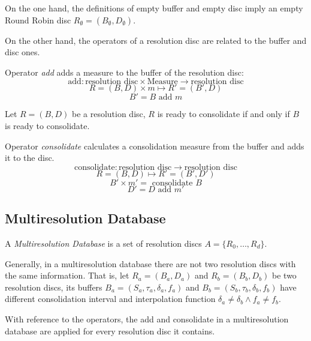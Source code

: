 On the one hand, the definitions of empty buffer and empty disc imply
an empty Round Robin disc $R_{\emptyset} = (B_{\emptyset},D_{\emptyset})$.

On the other hand, the operators of a resolution disc are related to
the buffer and disc ones.

\begin{definition}
  Operator \emph{add} adds a measure  to the buffer of the resolution disc:
  \[
  \text{add}: \text{resolution disc} \times \text{Measure}
  \longrightarrow \text{resolution disc}
  \]
  \[
  R=(B,D) \times m \mapsto R'= (B',D)
  \]
  \[
  B'= B \text{ add } m
  \]
\end{definition}

\begin{definition}
  Let $R=(B,D)$ be a resolution disc, $R$ is ready to consolidate if
  and only if $B$ is ready to consolidate.
\end{definition}

\begin{definition}
  Operator \emph{consolidate} calculates a consolidation measure from
  the buffer and adds it to the disc.
  \[
  \text{consolidate}: \text{resolution disc} \longrightarrow
  \text{resolution disc}
  \]
  \[
  R=(B,D) \mapsto R'= (B',D')
  \]
  \[
  B' \times m'= \text{ consolidate } B 
  \]
  \[
  D'= D \text{ add } m'
  \]
\end{definition}



\subsection{Multiresolution Database}\label{sec:model:rrd}

\begin{definition}
  A \emph{Multiresolution Database} is a set of resolution discs
  $A=\{R_0,\ldots,R_d\}$.
\end{definition}

 
Generally, in a multiresolution database there are not two resolution discs
with the same information. That is, let $R_a = (B_a, D_a)$ and $R_b =
(B_b, D_b)$ be two resolution discs, its buffers
$B_a=(S_a,\tau_a,\delta_a,f_a)$ and $B_b=(S_b,\tau_b,\delta_b,f_b)$
have different consolidation interval and interpolation function
$\delta_a \neq \delta_b \wedge f_a \neq f_b$.


With reference to the operators, the add and consolidate in a multiresolution database are applied for every resolution disc it contains.


